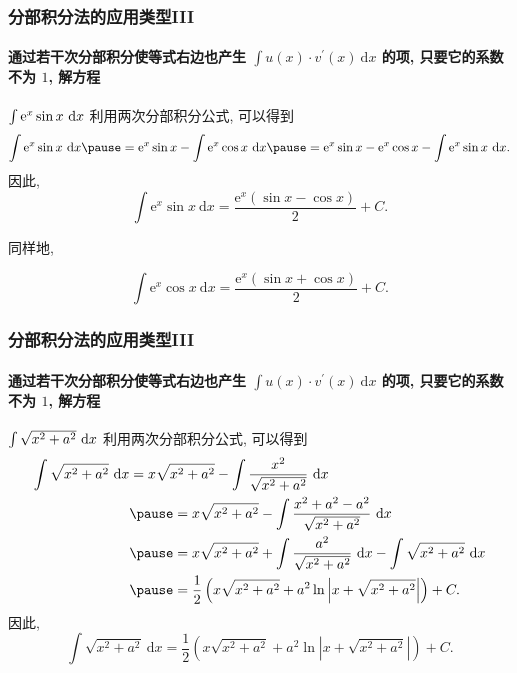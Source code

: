 \documentclass[
10pt,
aspectratio=43,
]{beamer}
\begin{document}
\begin{frame}
	\frametitle{分部积分法的应用类型III}
	\framesubtitle{通过若干次分部积分使等式右边也产生 $\int u(x) \cdot v^{\prime}(x) \mathrm{~d} x$ 的项, 只要它的系数不为 $1$, 解方程}
	\everymath{\displaystyle}
	\begin{exampleblock}{$\color{black}\int \mathrm{e}^x \sin x \mathrm{~d} x$}
		\pause 利用两次分部积分公式, 可以得到 \pause 
		$$
			\int \mathrm{e}^x \sin x \mathrm{~d} x\pause =\mathrm{e}^x \sin x-\int \mathrm{e}^x \cos x \mathrm{~d} x\pause =\mathrm{e}^x \sin x-\mathrm{e}^x \cos x-\int \mathrm{e}^x \sin x \mathrm{~d} x.
		$$
		\pause 因此,
		$$
			\int \mathrm{e}^x \sin x \mathrm{~d} x=\frac{\mathrm{e}^x(\sin x-\cos x)}{2}+C.
		$$
	\end{exampleblock}
	\pause 同样地,\pause 
	\begin{exampleblock}{}
		$$
			\int \mathrm{e}^x \cos x \mathrm{~d} x=\frac{\mathrm{e}^x(\sin x+\cos x)}{2}+C.
		$$
	\end{exampleblock}
\end{frame}

\begin{frame}
	\frametitle{分部积分法的应用类型III}
	\framesubtitle{通过若干次分部积分使等式右边也产生 $\int u(x) \cdot v^{\prime}(x) \mathrm{~d} x$ 的项, 只要它的系数不为 $1$, 解方程}
	\everymath{\displaystyle}
	{\small
		\begin{exampleblock}{$\color{black}\int \sqrt{x^2+a^2} \mathrm{~d} x$}
			\pause 利用两次分部积分公式, 可以得到
			$$
				\begin{aligned}
					\int \sqrt{x^2+a^2} \mathrm{~d} x & =x \sqrt{x^2+a^2}-\int \frac{x^2}{\sqrt{x^2+a^2}} \mathrm{~d} x                                   \\
					                                  & \pause =x \sqrt{x^2+a^2}-\int \frac{x^2+a^2-a^2}{\sqrt{x^2+a^2}} \mathrm{~d} x                           \\
					                                  & \pause =x \sqrt{x^2+a^2}+\int \frac{a^2}{\sqrt{x^2+a^2}} \mathrm{~d} x-\int \sqrt{x^2+a^2} \mathrm{~d} x \\
					                                  & \pause =\frac{1}{2}\left(x \sqrt{x^2+a^2}+a^2 \ln \left|x+\sqrt{x^2+a^2}\right|\right)+C.
				\end{aligned}
			$$
			\pause 因此,
			$$
				\int \sqrt{x^2+a^2} \mathrm{~d} x=\frac{1}{2}\left(x \sqrt{x^2+a^2}+a^2 \ln \left|x+\sqrt{x^2+a^2}\right|\right)+C.
			$$
		\end{exampleblock}
	}
\end{frame}
\end{document}
